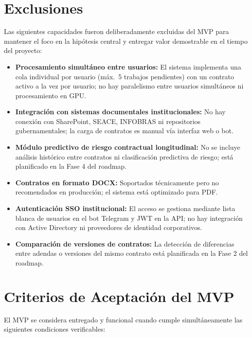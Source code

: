 \section{Exclusiones}

Las siguientes capacidades fueron deliberadamente excluidas del MVP para
mantener el foco en la hipótesis central y entregar valor demostrable
en el tiempo del proyecto:

\begin{itemize}
    \item \textbf{Procesamiento simultáneo entre usuarios:} El sistema
    implementa una cola individual por usuario (máx.\ 5 trabajos pendientes)
    con un contrato activo a la vez por usuario; no hay paralelismo entre
    usuarios simultáneos ni procesamiento en GPU.
    \item \textbf{Integración con sistemas documentales institucionales:}
    No hay conexión con SharePoint, SEACE, INFOBRAS ni repositorios
    gubernamentales; la carga de contratos es manual vía interfaz web o bot.
    \item \textbf{Módulo predictivo de riesgo contractual longitudinal:}
    No se incluye análisis histórico entre contratos ni clasificación
    predictiva de riesgo; está planificado en la Fase 4 del roadmap.
    \item \textbf{Contratos en formato DOCX:} Soportados técnicamente pero
    no recomendados en producción; el sistema está optimizado para PDF.
    \item \textbf{Autenticación SSO institucional:} El acceso se gestiona
    mediante lista blanca de usuarios en el bot Telegram y JWT en la API;
    no hay integración con Active Directory ni proveedores de identidad
    corporativos.
    \item \textbf{Comparación de versiones de contratos:} La detección
    de diferencias entre adendas o versiones del mismo contrato está
    planificada en la Fase 2 del roadmap.
\end{itemize}

\section{Criterios de Aceptación del MVP}

El MVP se considera entregado y funcional cuando cumple simultáneamente
las siguientes condiciones verificables:

